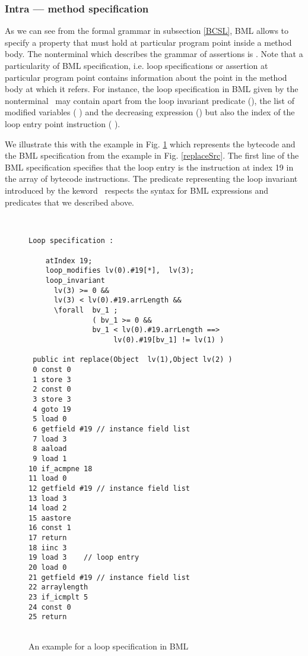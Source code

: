 \subsubsection{Intra --- method specification}
As we can see from the formal  grammar in subsection \ref{BCSL}, BML allows to specify a property that must hold at 
particular program point inside a method body. The nonterminal which describes the grammar of assertions is
 \intraMethodSpec.
 Note that a particularity of BML specification, i.e. loop specifications or assertion at particular program point
 contains information about the point in the method body at which it refers.
 For instance, the loop specification in BML given by the nonterminal \loopSpec \ 
may contain apart from the loop invariant predicate  (\loopInv), the list of modified variables ( \loopMod) and
 the decreasing expression (\loopDecreases ) but also  the index of the loop entry point instruction ( \atIndex ).

We illustrate this with the example in Fig. \ref{bml:loopBML} which represents the bytecode and the BML specification 
from the example in Fig. \ref{replaceSrc}. The first line of the BML specification 
specifies that the loop entry is the instruction at index  19 in the array of bytecode instructions. The predicate
 representing  the loop invariant introduced by the keword \loopInv \ respects the syntax for BML expressions and predicates
 that we described above. 
 
\begin{figure}
\begin{lstlisting}[frame=trbl]

  
Loop specification :

    atIndex 19;
    loop_modifies lv(0).#19[*],  lv(3);
    loop_invariant
      lv(3) >= 0 &&  
      lv(3) < lv(0).#19.arrLength &&
      \forall  bv_1 ; 
               ( bv_1 >= 0 &&
               bv_1 < lv(0).#19.arrLength ==> 
                    lv(0).#19[bv_1] != lv(1) )

 public int replace(Object  lv(1),Object lv(2) )
 0 const 0
 1 store 3
 2 const 0
 3 store 3
 4 goto 19
 5 load 0
 6 getfield #19 // instance field list
 7 load 3
 8 aaload
 9 load 1
10 if_acmpne 18 
11 load 0
12 getfield #19 // instance field list
13 load 3
14 load 2
15 aastore
16 const 1
17 return
18 iinc 3  
19 load 3    // loop entry 
20 load 0
21 getfield #19 // instance field list 
22 arraylength
23 if_icmplt 5
24 const 0
25 return
 
\end{lstlisting}
\caption{\sc An example for a loop specification in BML} \label{bml:loopBML}\end{figure}



